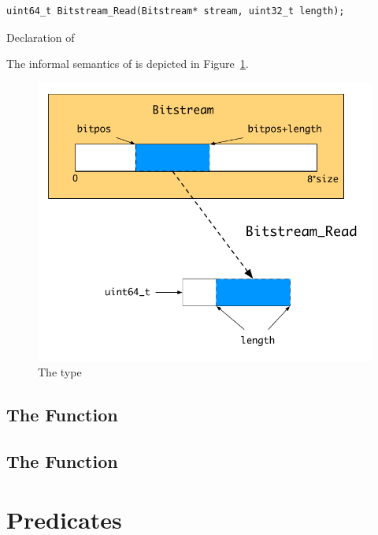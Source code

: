 \begin{listing}[hbt]
\begin{lstlisting}[style=acsl-block]
    uint64_t Bitstream_Read(Bitstream* stream, uint32_t length);
\end{lstlisting}
\caption{\label{lst:bitstream-read-declaration} Declaration of \bitstreamread}
\end{listing}

\FloatBarrier

The informal semantics of \bitstreamread is depicted in Figure~\ref{fig:bit-stream-read}.

\begin{figure}[hbt]
\begin{center}
\includegraphics[scale=0.85]{Figures/bit-stream-read.pdf}
\caption{The type \bitstream}
\label{fig:bit-stream-read}
\end{center}
\end{figure}

\subsection{The Function }

\subsection{The Function }

\section{Predicates}
